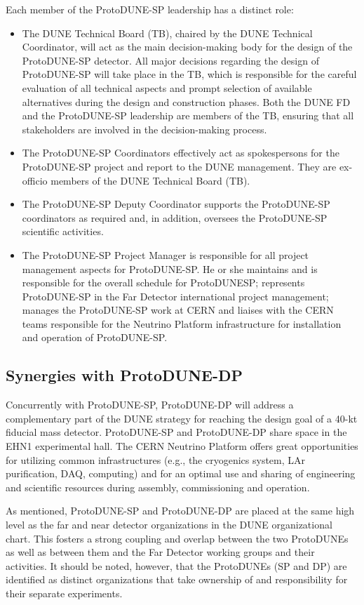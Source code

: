 Each member of the ProtoDUNE-SP leadership has a distinct role:
\begin{itemize}
\item The DUNE Technical Board (TB), chaired by the DUNE Technical Coordinator, will act as the main decision-making body for the design of the ProtoDUNE-SP detector. All major decisions regarding the design of ProtoDUNE-SP will take place in the TB, which is responsible for the careful evaluation of all technical aspects and prompt selection of available alternatives during the design and construction phases. Both the DUNE FD and the ProtoDUNE-SP leadership are members of the TB, ensuring that all stakeholders are involved in the decision-making process.
\item The ProtoDUNE-SP Coordinators effectively act as spokespersons for the ProtoDUNE-SP project and report to the DUNE management. They are ex-officio members of the DUNE Technical Board (TB).
\item The ProtoDUNE-SP Deputy Coordinator supports the ProtoDUNE-SP coordinators as required and, in addition, oversees the ProtoDUNE-SP scientific activities. 
\item The ProtoDUNE-SP Project Manager is responsible for all project management aspects for ProtoDUNE-SP. He or she maintains and is responsible for the overall schedule for ProtoDUNESP; represents ProtoDUNE-SP in the Far Detector international project management; manages the ProtoDUNE-SP work at CERN and liaises with the CERN teams responsible for the Neutrino Platform infrastructure for installation and operation of ProtoDUNE-SP.
\end{itemize}

\subsection{Synergies with ProtoDUNE-DP}

Concurrently with ProtoDUNE-SP, ProtoDUNE-DP will address a complementary part of the DUNE strategy for reaching the design goal of a 40-kt fiducial mass detector. ProtoDUNE-SP and ProtoDUNE-DP share space in the EHN1 experimental hall.  The CERN Neutrino Platform offers great opportunities for utilizing common infrastructures (e.g., the cryogenics system, LAr purification, DAQ, computing) and for an optimal use and sharing of engineering and scientific resources during assembly, commissioning and operation.

As mentioned, ProtoDUNE-SP and ProtoDUNE-DP are placed at the same high level as the far and near detector organizations in the DUNE organizational chart. This fosters a strong coupling and overlap between the two ProtoDUNEs as well as between them and the Far Detector working groups and their activities. It should be noted, however, that the ProtoDUNEs (SP and DP) are identified as distinct organizations that take ownership of and responsibility for their separate experiments.

